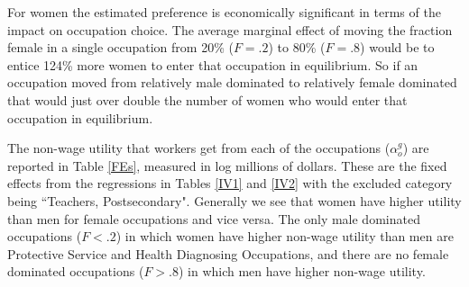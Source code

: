 \documentclass[12pt]{article}
\begin{document}





For women the estimated preference is economically significant in terms of the impact on occupation choice. The average marginal effect of moving the fraction female in a single occupation from 20\% ($F=.2$) to 80\% ($F=.8$) would be to entice 124\% more women to enter that occupation in equilibrium. So if an occupation moved from relatively male dominated to relatively female dominated that would just over double the number of women who would enter that occupation in equilibrium.



The non-wage utility that workers get from each of the occupations ($\alpha^g_o$) are reported in Table \ref{FEs}, measured in log millions of dollars. These are the fixed effects from the regressions in Tables \ref{IV1} and \ref{IV2} with the excluded category being ``Teachers, Postsecondary". Generally we see that women have higher utility than men for female occupations and vice versa. The only male dominated occupations ($F<.2$) in which women have higher non-wage utility than men are Protective Service and Health Diagnosing Occupations, and there are no female dominated occupations ($F>.8$) in which men have higher non-wage utility.
\end{document}
